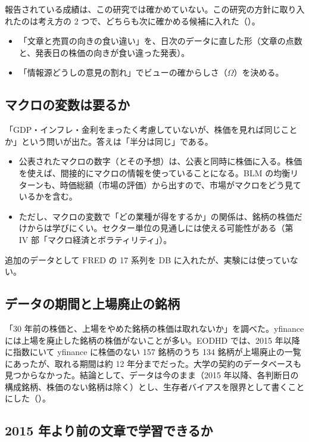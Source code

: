 報告されている成績は、この研究では確かめていない。この研究の方針に取り入れたのは考え方の 2 つで、どちらも次に確かめる候補に入れた（）。
\begin{itemize}
\item 「文章と売買の向きの食い違い」を、日次のデータに直した形（文章の点数と、発表日の株価の向きが食い違った発表）。
\item 「情報源どうしの意見の割れ」でビューの確からしさ（$\Omega$）を決める。
\end{itemize}

\subsection{マクロの変数は要るか}

「GDP・インフレ・金利をまったく考慮していないが、株価を見れば同じことか」という問いが出た。答えは「半分は同じ」である。
\begin{itemize}
\item 公表されたマクロの数字（とその予想）は、公表と同時に株価に入る。株価を使えば、間接的にマクロの情報を使っていることになる。BLM の均衡リターンも、時価総額（市場の評価）から出すので、市場がマクロをどう見ているかを含む。
\item ただし、マクロの変数で「どの業種が得をするか」の関係は、銘柄の株価だけからは学びにくい。セクター単位の見通しには使える可能性がある（第 IV 部「マクロ経済とボラティリティ」）。
\end{itemize}
追加のデータとして FRED の 17 系列を DB に入れたが、実験には使っていない。

\subsection{データの期間と上場廃止の銘柄}

「30 年前の株価と、上場をやめた銘柄の株価は取れないか」を調べた。yfinance には上場を廃止した銘柄の株価がないことが多い。EODHD では、2015 年以降に指数にいて yfinance に株価のない 157 銘柄のうち 134 銘柄が上場廃止の一覧にあったが、取れる期間は約 12 年分までだった。大学の契約のデータベースも見つからなかった。結論として、データは今のまま（2015 年以降、各判断日の構成銘柄、株価のない銘柄は除く）とし、生存者バイアスを限界として書くことにした（）。

\subsection{2015 年より前の文章で学習できるか}

